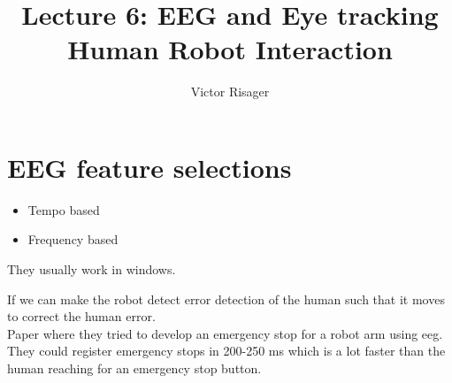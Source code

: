 \documentclass[a4paper]{article}
\title{Lecture 6: EEG and Eye tracking  \\
	\large Human Robot Interaction}
\author{Victor Risager}
\begin{document}
\maketitle
\section{EEG feature selections}	
\begin{itemize}
	\item Tempo based 
	\item Frequency based
\end{itemize}

They usually work in windows.

If we can make the robot detect error detection of the human such that it moves to correct the human error. \\
Paper where they tried to develop an emergency stop for a robot arm using eeg. 
They could register emergency stops in 200-250 ms which is a lot faster than the human reaching for an emergency stop button.  
    
\end{document}
